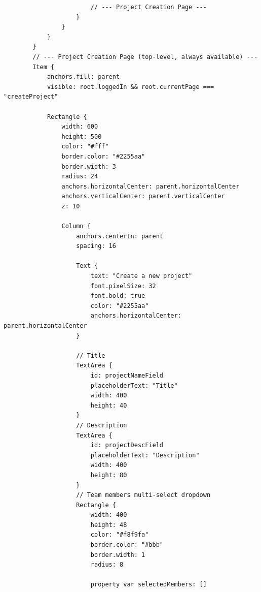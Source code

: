 \documentclass{report}
\begin{document}
\begin{lstlisting}
                        // --- Project Creation Page ---
                    }
                }
            }
        }
        // --- Project Creation Page (top-level, always available) ---
        Item {
            anchors.fill: parent
            visible: root.loggedIn && root.currentPage === "createProject"
    
            Rectangle {
                width: 600
                height: 500
                color: "#fff"
                border.color: "#2255aa"
                border.width: 3
                radius: 24
                anchors.horizontalCenter: parent.horizontalCenter
                anchors.verticalCenter: parent.verticalCenter
                z: 10
    
                Column {
                    anchors.centerIn: parent
                    spacing: 16
    
                    Text {
                        text: "Create a new project"
                        font.pixelSize: 32
                        font.bold: true
                        color: "#2255aa"
                        anchors.horizontalCenter: parent.horizontalCenter
                    }
    
                    // Title
                    TextArea {
                        id: projectNameField
                        placeholderText: "Title"
                        width: 400
                        height: 40
                    }
                    // Description
                    TextArea {
                        id: projectDescField
                        placeholderText: "Description"
                        width: 400
                        height: 80
                    }
                    // Team members multi-select dropdown
                    Rectangle {
                        width: 400
                        height: 48
                        color: "#f8f9fa"
                        border.color: "#bbb"
                        border.width: 1
                        radius: 8
    
                        property var selectedMembers: []
    

\end{lstlisting}
\end{document}
